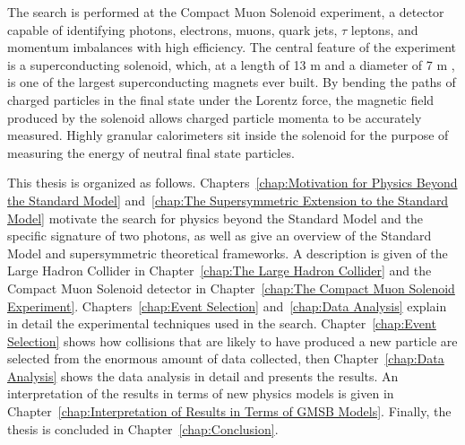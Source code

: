 \documentclass[dissertation.tex]{subfiles}
\begin{document}
The search is performed at the Compact Muon Solenoid experiment, a detector capable of identifying photons, electrons, muons, quark jets, $\tau$ leptons, and momentum imbalances with high efficiency.  The central feature of the experiment is a superconducting solenoid, which, at a length of 13 m and a diameter of 7 m \cite{CMS_public}, is one of the largest superconducting magnets ever built.  By bending the paths of charged particles in the final state under the Lorentz force, the magnetic field produced by the solenoid allows charged particle momenta to be accurately measured.  Highly granular calorimeters sit inside the solenoid for the purpose of measuring the energy of neutral final state particles.

This thesis is organized as follows.  Chapters~\ref{chap:Motivation for Physics Beyond the Standard Model} and~\ref{chap:The Supersymmetric Extension to the Standard Model} motivate the search for physics beyond the Standard Model and the specific signature of two photons, as well as give an overview of the Standard Model and supersymmetric theoretical frameworks.  A description is given of the Large Hadron Collider in Chapter~\ref{chap:The Large Hadron Collider} and the Compact Muon Solenoid detector in Chapter~\ref{chap:The Compact Muon Solenoid Experiment}.  Chapters~\ref{chap:Event Selection} and~\ref{chap:Data Analysis} explain in detail the experimental techniques used in the search.  Chapter~\ref{chap:Event Selection} shows how collisions that are likely to have produced a new particle are selected from the enormous amount of data collected, then Chapter~\ref{chap:Data Analysis} shows the data analysis in detail and presents the results.  An interpretation of the results in terms of new physics models is given in Chapter~\ref{chap:Interpretation of Results in Terms of GMSB Models}.  Finally, the thesis is concluded in Chapter~\ref{chap:Conclusion}.
\end{document}
